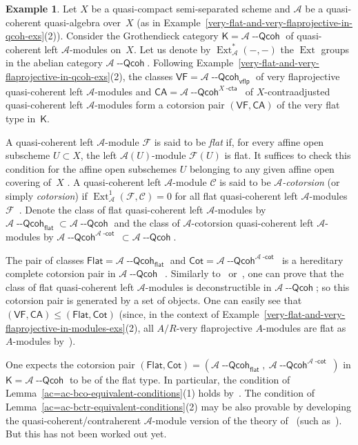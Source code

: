 \documentclass[12pt,a4paper]{amsart}
\newcommand{\+}{\nobreakdash-}
\renewcommand{\:}{\colon}
\DeclareMathOperator{\Ext}{Ext}
\newcommand{\Qcoh}{{\operatorname{\mathsf{--Qcoh}}}}
\newcommand{\sK}{\mathsf K}
\newcommand{\cA}{\mathcal A}
\newcommand{\cF}{\mathcal F}
\newcommand{\cC}{\mathcal C}
\newcommand{\VF}{\mathsf{VF}}
\newcommand{\CA}{\mathsf{CA}}
\newcommand{\Flat}{\mathsf{Flat}}
\newcommand{\Cot}{\mathsf{Cot}}
\renewcommand{\flat}{\mathsf{flat}}
\newcommand{\vflp}{\mathsf{vflp}}
\newcommand{\dcot}{{\operatorname{\mathsf{-cot}}}}
\newcommand{\dcta}{{\operatorname{\mathsf{-cta}}}}
\theoremstyle{plain}
\theoremstyle{definition}
\newtheorem{ex}[thm]{Example}
\begin{document}
\begin{ex} \label{flat-cotorsion-pair-in-qcoh-A-modules-flat-type}
 Let $X$ be a quasi-compact semi-separated scheme and $\cA$ be
a quasi-coherent quasi-algebra over~$X$ (as in
Example~\ref{very-flat-and-very-flaprojective-in-qcoh-exs}(2)).
 Consider the Grothendieck category $\sK=\cA\Qcoh$ of quasi-coherent
left $\cA$\+modules on~$X$.
 Let us denote by $\Ext_\cA^*({-},{-})$ the $\Ext$ groups in
the abelian category $\cA\Qcoh$.
 Following
Example~\ref{very-flat-and-very-flaprojective-in-qcoh-exs}(2),
the classes $\VF=\cA\Qcoh_\vflp$ of very flaprojective quasi-coherent
left $\cA$\+modules and $\CA=\cA\Qcoh^{X\dcta}$ of $X$\+contraadjusted
quasi-coherent left $\cA$\+modules form a cotorsion pair $(\VF,\CA)$
of the very flat type in~$\sK$.

 A quasi-coherent left $\cA$\+module $\cF$ is said to be \emph{flat}
if, for every affine open subscheme $U\subset X$, the left
$\cA(U)$\+module $\cF(U)$ is flat.
 It suffices to check this condition for the affine open subschemes $U$
belonging to any given affine open covering of~$X$
\cite[Lemma~1.24(a) and Section~3.4]{Pdomc}.
 A quasi-coherent left $\cA$\+module $\cC$ is said to be
\emph{$\cA$\+cotorsion} (or simply \emph{cotorsion}) if
$\Ext_\cA^1(\cF,\cC)=0$ for all flat quasi-coherent left
$\cA$\+modules~$\cF$ \,\cite[Section~4.3]{Pdomc}.
 Denote the class of flat quasi-coherent left $\cA$\+modules by
$\cA\Qcoh_\flat\subset\cA\Qcoh$ and the class of $\cA$\+cotorsion
quasi-coherent left $\cA$\+modules by $\cA\Qcoh^{\cA\dcot}\subset
\cA\Qcoh$.

 The pair of classes $\Flat=\cA\Qcoh_\flat$ and
$\Cot=\cA\Qcoh^{\cA\dcot}$ is a hereditary complete cotorsion pair
in $\cA\Qcoh$ \,\cite[Theorem~4.18 and Remark~4.20]{Pdomc}.
 Similarly to~\cite[Proposition~3.3]{EE}
or~\cite[Lemma~B.3.5]{Pcosh}, one can prove that the class of flat
quasi-coherent left $\cA$\+modules is deconstructible in $\cA\Qcoh$;
so this cotorsion pair is generated by a set of objects.
 One can easily see that $(\VF,\CA)\le(\Flat,\Cot)$ (since, in
the context of
Example~\ref{very-flat-and-very-flaprojective-in-modules-exs}(2),
all $A/R$\+very flaprojective $A$\+modules are flat as $A$\+modules
by~\cite[Remark~1.29]{Pdomc}).

 One expects the cotorsion pair
$(\Flat,\Cot)=(\cA\Qcoh_\flat,\>\cA\Qcoh^{\cA\dcot})$ in
$\sK=\cA\Qcoh$ to be of the flat type.
 In particular, the condition of
Lemma~\ref{ac=ac-bco-equivalent-conditions}(1) holds
by~\cite[Theorem~5.5]{Pdomc}.
 The condition of
Lemma~\ref{ac=ac-bctr-equivalent-conditions}(2) may be also provable
by developing the quasi-coherent/contraherent $\cA$\+module version
of the theory of~\cite[Chapter~5]{Pcosh} (such
as~\cite[Corollary~5.1.13]{Pcosh}).
 But this has not been worked out yet.
\end{ex}
\end{document}
